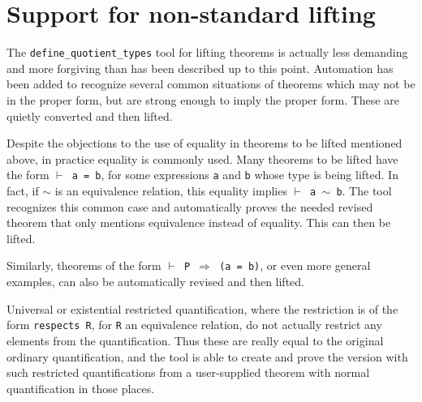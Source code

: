 \documentclass[envcountsame,runningheads]{llncs}
\begin{document}
\begin{comment}
Generally, any mention of equality between elements of a type being
lifted will make a theorem not liftable.  A variant of the theorem
should be proven which substitutes equivalence for the equality.
%
This should really not be surprising, since the purpose of collapsing
equivalence classes into single entities is meant to render the results
indistinguishable.  Therefore properties which rely on those distinctions
will not translate to the higher level, which in particular excludes
the equality relation between values which are now being declared as
equivalent.

\end{comment}


%
\section{Support for non-standard lifting}
%
\label{nonstandard}

The {\tt define\_quotient\_types} tool
for lifting theorems is actually less
demanding and more forgiving than has been described up to this point.
Automation has been added to recognize several common
situations of theorems which may not be in the proper form, but are
strong enough to imply the proper form.  These are quietly converted
and then lifted.

Despite the objections to the use of equality
in theorems to be lifted mentioned above, in practice equality is commonly used.
Many theorems to be lifted have the form
{\tt $\vdash$ a = b}, for some expressions {\tt a} and {\tt b} whose type is
being lifted.
In fact,
if $\sim$ is an equivalence relation,
this equality implies {\tt $\vdash$ a $\sim$ b}.
The tool recognizes this common case and automatically proves
the needed revised
theorem that only mentions equivalence instead of equality.
This can then be lifted.

Similarly, theorems of the form {\tt $\vdash$ P $\Rightarrow$ (a = b)}, or even more
general examples, can also be
automatically revised and then lifted.

Universal or existential restricted quantification, where the
restriction is of the form {\tt respects R}, for {\tt R} an equivalence
relation, do not actually restrict any elements from the quantification.
Thus these are really equal to the original ordinary quantification,
and the tool is able to create and prove the version with such
restricted quantifications from a user-supplied theorem with normal
quantification in those places.
\end{document}
